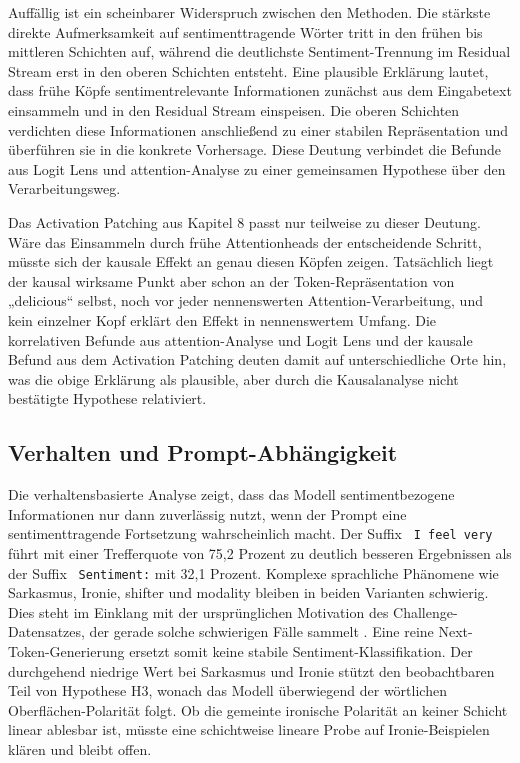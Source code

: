 Auffällig ist ein scheinbarer Widerspruch zwischen den Methoden. Die stärkste direkte Aufmerksamkeit auf sentimenttragende Wörter tritt in den frühen bis mittleren Schichten auf, während die deutlichste Sentiment-Trennung im Residual Stream erst in den oberen Schichten entsteht. Eine plausible Erklärung lautet, dass frühe Köpfe sentimentrelevante Informationen zunächst aus dem Eingabetext einsammeln und in den Residual Stream einspeisen. Die oberen Schichten verdichten diese Informationen anschließend zu einer stabilen Repräsentation und überführen sie in die konkrete Vorhersage. Diese Deutung verbindet die Befunde aus Logit Lens und \gls{attention}-Analyse zu einer gemeinsamen Hypothese über den Verarbeitungsweg.

Das Activation Patching aus Kapitel 8 passt nur teilweise zu dieser Deutung. Wäre das Einsammeln durch frühe Attentionheads der entscheidende Schritt, müsste sich der kausale Effekt an genau diesen Köpfen zeigen. Tatsächlich liegt der kausal wirksame Punkt aber schon an der Token-Repräsentation von „delicious“ selbst, noch vor jeder nennenswerten Attention-Verarbeitung, und kein einzelner Kopf erklärt den Effekt in nennenswertem Umfang. Die korrelativen Befunde aus \gls{attention}-Analyse und Logit Lens und der kausale Befund aus dem Activation Patching deuten damit auf unterschiedliche Orte hin, was die obige Erklärung als plausible, aber durch die Kausalanalyse nicht bestätigte Hypothese relativiert.

\subsection{Verhalten und Prompt-Abhängigkeit}

Die verhaltensbasierte Analyse zeigt, dass das Modell sentimentbezogene Informationen nur dann zuverlässig nutzt, wenn der Prompt eine sentimenttragende Fortsetzung wahrscheinlich macht. Der Suffix \texttt{ I feel very} führt mit einer Trefferquote von 75,2 Prozent zu deutlich besseren Ergebnissen als der Suffix \texttt{ Sentiment:} mit 32,1 Prozent. Komplexe sprachliche Phänomene wie Sarkasmus, Ironie, shifter und modality bleiben in beiden Varianten schwierig. Dies steht im Einklang mit der ursprünglichen Motivation des Challenge-Datensatzes, der gerade solche schwierigen Fälle sammelt \cite{barnes2019sentiment}. Eine reine Next-Token-Generierung ersetzt somit keine stabile Sentiment-Klassifikation. Der durchgehend niedrige Wert bei Sarkasmus und Ironie stützt den beobachtbaren Teil von Hypothese H3, wonach das Modell überwiegend der wörtlichen Oberflächen-Polarität folgt. Ob die gemeinte ironische Polarität an keiner Schicht linear ablesbar ist, müsste eine schichtweise lineare Probe auf Ironie-Beispielen klären und bleibt offen.

